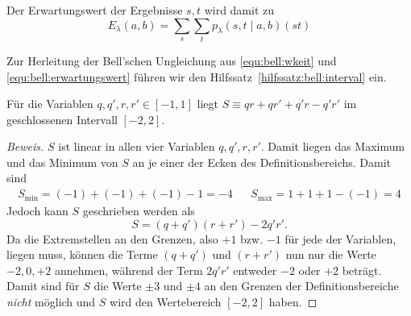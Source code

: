 \begin{refsection}
Der Erwartungswert der Ergebnisse $s,t$ wird damit zu
\begin{equation}
    E_{\lambda}(a,b) = \sum_s \sum_t p_{\lambda}(s,t \mid a,b) (st)
    \label{equ:bell:erwartungswert}
\end{equation}

Zur Herleitung der Bell'schen Ungleichung aus \eqref{equ:bell:wkeit} und
\eqref{equ:bell:erwartungswert} f\"uhren wir den
Hilfssatz~\ref{hilfssatz:bell:interval} ein.

\begin{hilfssatz}
    F\"ur die Variablen $q, q', r, r' \in [-1,1]$ liegt 
    $S \equiv qr + qr' + q'r - q'r'$ im geschlossenen Intervall $[-2,2]$.
    \label{hilfssatz:bell:interval}
\end{hilfssatz}
\begin{proof}[Beweis]
    $S$ ist linear in allen vier Variablen $q, q', r, r'$.
    Damit liegen das Maximum und das Minimum von $S$ an je einer der Ecken des
    Definitionsbereichs. Damit sind
    \begin{align*}
        S_{\text{min}} = (-1) + (-1) + (-1) - 1 = -4 &&
        S_ {\text{max}} = 1 + 1 + 1 - (-1) = 4
    \end{align*}
    Jedoch kann $S$ geschrieben werden als
    \[
        S = (q + q')(r + r') - 2 q'r'.
    \]
    Da die Extremstellen an den Grenzen, also $+1$ bzw. $-1$ f\"ur jede der
    Variablen, liegen muss, k\"onnen die Terme $(q+q')$ und $(r+r')$ nun nur
    die Werte $-2, 0, +2$ annehmen, w\"ahrend der Term $2q'r'$ 
    entweder $-2$ oder $+2$ betr\"agt.
    Damit sind f\"ur $S$ die Werte $\pm 3$ und $\pm 4$ an den Grenzen der
    Definitionsbereiche \emph{nicht} m\"oglich und $S$ wird den Wertebereich
    $[-2,2]$ haben.
\end{proof}


\end{refsection}
